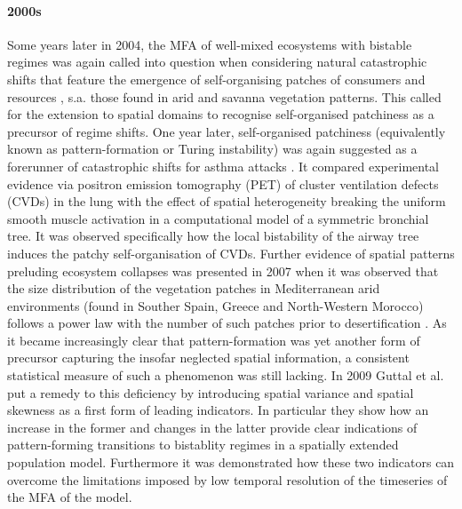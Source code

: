 \documentclass[../main.tex]{subfiles}
\begin{document}
\paragraph{2000s}
Some years later in 2004, the MFA of well-mixed ecosystems with bistable regimes was again called into question when considering natural catastrophic shifts that feature the emergence of self-organising patches of consumers and resources \cite{Rietkerk04}, s.a. those found in arid and savanna vegetation patterns. 
This called for the extension to spatial domains to recognise self-organised patchiness as a precursor of regime shifts.
One year later, self-organised patchiness (equivalently known as pattern-formation or Turing instability) was again suggested as a forerunner of catastrophic shifts for asthma attacks \cite{Venegas05}. 
It compared experimental evidence via positron emission tomography (PET) of cluster ventilation defects (CVDs) in the lung with the effect of spatial heterogeneity breaking the uniform smooth muscle activation in a computational model of a symmetric bronchial tree. 
It was observed specifically how the local bistability of the airway tree induces the patchy self-organisation of CVDs. 
Further evidence of spatial patterns preluding ecosystem collapses was presented in 2007 when it was observed that the size distribution of the vegetation patches in Mediterranean arid environments (found in Souther Spain, Greece and North-Western Morocco) follows a power law with the number of such patches prior to desertification \cite{Kefi07}. 
As it became increasingly clear that pattern-formation was yet another form of precursor capturing the insofar neglected spatial information, a consistent statistical measure of such a phenomenon was still lacking.
In 2009 Guttal et al. \cite{Guttal09} put a remedy to this deficiency by introducing spatial variance and spatial skewness as a first form of leading indicators. 
In particular they show how an increase in the former and changes in the latter provide clear indications of pattern-forming transitions to bistablity regimes in a spatially extended population model.
Furthermore it was demonstrated how these two indicators can overcome the limitations imposed by low temporal resolution of the timeseries of the MFA of the model.
\end{document}
